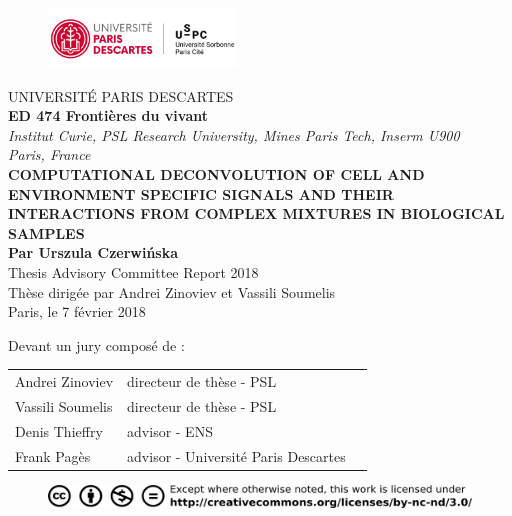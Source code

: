 \documentclass[12pt,]{book}
\title{}
\author{}
\date{}
\theoremstyle{definition}
\theoremstyle{definition}
\theoremstyle{definition}
\theoremstyle{remark}
\begin{document}
\begin{titlepage}
\frontmatter
\begin{figure}[t]
\includegraphics[width=5cm]{figures-ext/LogoParisDescartes}
\end{figure}
\begin{center}
UNIVERSITÉ PARIS DESCARTES \\
\vspace*{1cm}
\textbf{ED 474 Frontières du vivant}\\
\vspace*{0,5cm}
\textit{Institut Curie, PSL Research University, Mines Paris Tech, Inserm U900 \\Paris, France}\\
\vspace*{1cm}
\LARGE{\textbf{COMPUTATIONAL DECONVOLUTION OF CELL AND ENVIRONMENT SPECIFIC SIGNALS AND
THEIR INTERACTIONS FROM COMPLEX MIXTURES IN BIOLOGICAL SAMPLES}}\\
\large{\textbf{Par Urszula Czerwińska}}\\
\vspace*{1cm}
Thesis Advisory Committee Report 2018\\
\vspace*{1cm}
Thèse dirigée par Andrei Zinoviev et Vassili Soumelis\\
\vspace*{1cm}
\small{Paris, le 7 février 2018}\\
\end{center}
\vspace*{1cm}
\begin{footnotesize}
Devant un jury composé de : \\
\begin{tabular}{lll}
Andrei Zinoviev & directeur de thèse - PSL\\
Vassili Soumelis & directeur de thèse - PSL\\
Denis Thieffry & advisor - ENS\\
Frank Pagès & advisor - Université Paris Descartes\\
\end{tabular}
\end{footnotesize}

\begin{figure}[b]
\begin{center}
\includegraphics{figures-ext/creativecommons}
\end{center}
\end{figure}





\end{titlepage}
\end{document}
